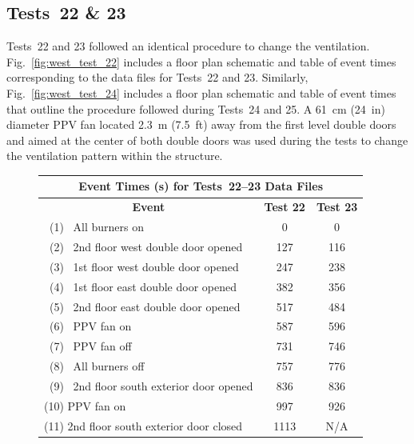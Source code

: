 \documentclass[12pt,oneside]{book}
\begin{document}
\subsection{Tests~22 \& 23}
Tests~22 and 23 followed an identical procedure to change the ventilation. Fig.~\ref{fig:west_test_22} includes a floor plan schematic and table of event times corresponding to the data files for Tests~22 and 23. Similarly, Fig.~\ref{fig:west_test_24} includes a floor plan schematic and table of event times that outline the procedure followed during Tests~24 and 25. A 61~cm (24~in) diameter PPV fan located 2.3~m (7.5~ft) away from the first level double doors and aimed at the center of both double doors was used during the tests to change the ventilation pattern within the structure.
\begin{figure}[!ht]
\begin{minipage}[b]{0.8\columnwidth}
	\begin{flushleft}
	\begin{tabular}{lcc}
	\multicolumn{3}{c}{Event Times (s) for Tests~22--23 Data Files} \\
	\toprule
	\multicolumn{1}{c}{\textbf{Event}} 			& \textbf{Test 22}	& \textbf{Test 23} \\
	\midrule
	~(1)~  All burners on 						&   0	  			&	 0			\\
	~(2)~  2nd floor west double door opened 	&   127		  		&    116		\\
	~(3)~  1st floor west double door opened 	&	247		  		&    238 	 	\\
	~(4)~  1st floor east double door opened 	&   382			  	&    356		\\
	~(5)~  2nd floor east double door opened	&   517			  	&    484		\\
	~(6)~  PPV fan on 							&   587			  	&    596		\\
	~(7)~  PPV fan off              			&   731			  	&    746		\\
	~(8)~  All burners off 						&   757			  	&    776		\\
	~(9)~  2nd floor south exterior door opened &   836			  	&    836		\\
	(10) PPV fan on 	 						&   997			  	&    926		\\
	(11) 2nd floor south exterior door closed   &   1113		  	&    N/A		\\
	\bottomrule
	\end{tabular}
	\end{flushleft}
\end{minipage}
\begin{minipage}[b]{0.9\columnwidth}

\end{minipage}
\end{figure}
\end{document}
